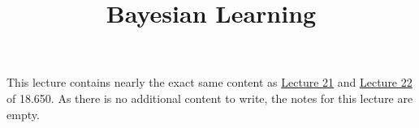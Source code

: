 \title{Bayesian Learning}



\begin{remark}
    This lecture contains nearly the exact same content
    as \href{/18.650/lectures/21}{Lecture 21}
    and \href{/18.650/lectures/22}{Lecture 22} of 18.650.
    As there is no additional content to write,
    the notes for this lecture are empty.
\end{remark}

